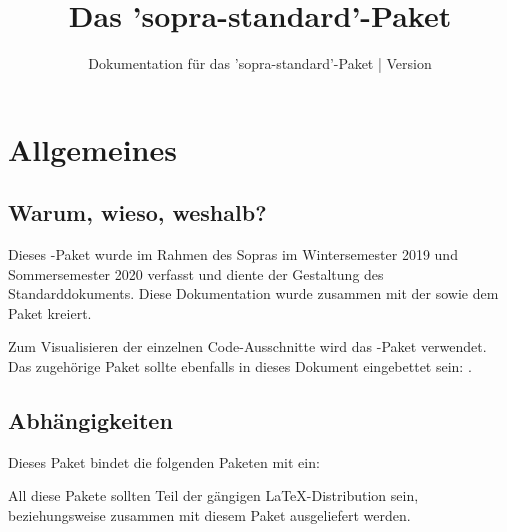 \documentclass{sopra-base}
\title{Das 'sopra-standard'-Paket}
\subtitle[Dokumentation für das 'sopra-standard'-Paket]{Dokumentation für das 'sopra-standard'-Paket | Version \thesosversion}
\begin{document}
    \maketitle

%
%
%
%

\section{Allgemeines}
\subsection{Warum, wieso, weshalb?}
    Dieses \LaTeXe-Paket wurde im Rahmen des Sopras im
    Wintersemester 2019 und Sommersemester 2020 verfasst und diente der Gestaltung des Standarddokuments. Diese Dokumentation wurde zusammen mit der
     sowie dem Paket  kreiert.\par
    Zum Visualisieren der einzelnen Code-Ausschnitte wird das
    -Paket verwendet.
    Das zugehörige Paket sollte ebenfalls in dieses Dokument eingebettet sein: .
\subsection{Abhängigkeiten}
    Dieses Paket bindet die folgenden Paketen mit ein:
    \begin{multicols}{4}
    \end{multicols}
    All diese Pakete sollten Teil der gängigen \LaTeX-Distribution sein, beziehungsweise zusammen mit diesem Paket ausgeliefert werden.
\end{document}
